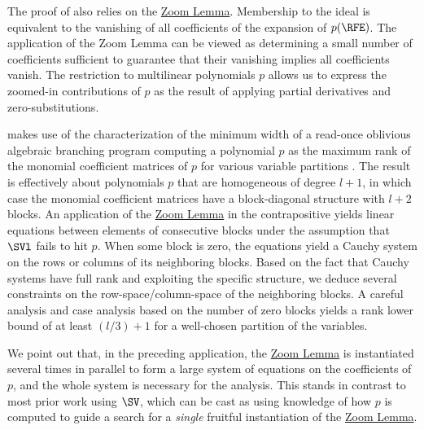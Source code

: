\documentclass{toc}
\begin{document}
The proof of  also relies on the
\hyperref[lem.multi-zsub-deriv]{Zoom Lemma}. 
Membership to the ideal is equivalent to the vanishing of all coefficients of
the expansion of $p(\RFE)$.
The application of the Zoom Lemma can be viewed as determining a small number of coefficients
sufficient to guarantee that their vanishing implies all coefficients vanish.
The restriction to multilinear polynomials $p$ allows us to express the
zoomed-in contributions of $p$ as the result of applying partial derivatives and
zero-substitutions.

 makes use of the characterization of the minimum width
of a read-once oblivious algebraic branching program computing a polynomial
$p$ as the maximum rank of the monomial coefficient matrices of $p$ for
various variable partitions \cite{Nisan1991}.
The result is effectively about polynomials \(p\) that are homogeneous of degree $l+1$,
in which case the monomial coefficient matrices have a block-diagonal structure with $l+2$ blocks.
An application of the \hyperref[lem.multi-zsub-deriv]{Zoom Lemma} in the contrapositive yields linear equations
between elements of consecutive blocks under the assumption that $\SVl$ fails to hit $p$.
When some block is zero, the equations yield a Cauchy system on the rows or columns of its
neighboring blocks. Based on the fact that Cauchy systems have full rank and exploiting the specific structure, we deduce several constraints on the row-space/column-space of the neighboring blocks. A careful analysis and case analysis based on the number of zero blocks yields a rank lower bound of at least $(l/3)+1$ for a well-chosen partition of the variables.

We point out that, in the preceding application,
the \hyperref[lem.multi-zsub-deriv]{Zoom Lemma} is instantiated several times in parallel to form a large
system of equations on the coefficients of \(p\),
and the whole system is necessary for the analysis.
This stands in contrast to most prior work using \(\SV\),
which can be cast as using knowledge of how \(p\) is computed to guide a search for a
\emph{single} fruitful instantiation of the \hyperref[lem.multi-zsub-deriv]{Zoom Lemma}.
\end{document}

